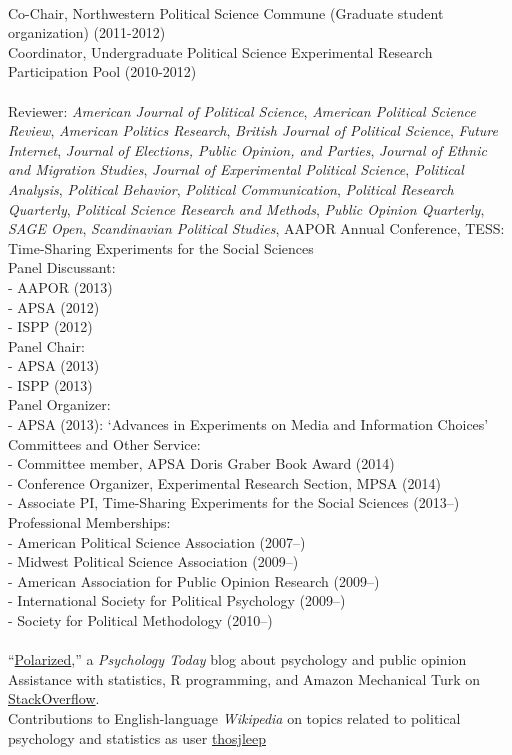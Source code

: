 \documentclass[12pt]{article}
\renewcommand{\section}[1]{\pagebreak[3]%
    \llap{\scshape\smash{\parbox[t]{\marginparwidth}{\raggedright {\color{lg}#1}}}}%
    \vspace{-\baselineskip}\par}
\newcommand{\topic}[1]{\pagebreak[3]\indent {\color{lg}{\footnotesize #1 }}\\}
\newcommand{\entry}[1]{\indent {\color{lg}\guillemotright}\hspace{2pt}#1\vspace{.25em}\\}
\newcommand{\subentry}[1]{{\color{lg}-} #1\vspace{.25em}\\}
\begin{document}
\section{Service}
\topic{Departmental}
\entry{Co-Chair, Northwestern Political Science Commune (Graduate student organization) (2011-2012)}
\entry{Coordinator, Undergraduate Political Science Experimental Research Participation Pool (2010-2012)}

\topic{Disciplinary}
\entry{Reviewer: {\em American Journal of Political Science}, {\em American Political Science Review}, {\em American Politics Research}, {\em British Journal of Political Science}, {\em Future Internet}, {\em Journal of Elections, Public Opinion, and Parties}, {\em Journal of Ethnic and Migration Studies}, {\em Journal of Experimental Political Science}, {\em Political Analysis}, {\em Political Behavior}, {\em Political Communication}, {\em Political Research Quarterly}, {\em Political Science Research and Methods}, {\em Public Opinion Quarterly}, {\em SAGE Open}, {\em Scandinavian Political Studies}, AAPOR Annual Conference, TESS: Time-Sharing Experiments for the Social Sciences}
\entry{Panel Discussant:}
\subentry{AAPOR (2013)}
\subentry{APSA (2012)}
\subentry{ISPP (2012)}
\entry{Panel Chair:}
\subentry{APSA (2013)}
\subentry{ISPP (2013)}
\entry{Panel Organizer:}
\subentry{APSA (2013): `Advances in Experiments on Media and Information Choices'}
\entry{Committees and Other Service:}
\subentry{Committee member, APSA Doris Graber Book Award (2014)}
\subentry{Conference Organizer, Experimental Research Section, MPSA (2014)}
\subentry{Associate PI, Time-Sharing Experiments for the Social Sciences (2013--)}
\entry{Professional Memberships:}
\subentry{American Political Science Association (2007--)}
\subentry{Midwest Political Science Association (2009--)}
\subentry{American Association for Public Opinion Research (2009--)}
\subentry{International Society for Political Psychology (2009--)}
\subentry{Society for Political Methodology (2010--)}

\topic{Public Engagement}
\entry{``\href{http://www.psychologytoday.com/blog/polarized}{Polarized},'' a {\em Psychology Today} blog about psychology and public opinion}
\entry{Assistance with statistics, R programming, and Amazon Mechanical Turk on \href{http://stackoverflow.com/users/2338862/thomas}{StackOverflow}.}
\entry{Contributions to English-language {\em Wikipedia} on topics related to political psychology and statistics as user \href{http://en.wikipedia.org/wiki/Special:Contributions/Thosjleep}{thosjleep}}
\end{document}

